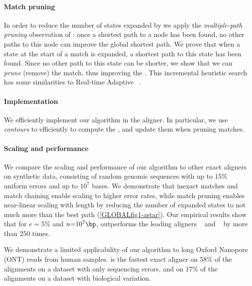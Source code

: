 \paragraph{Match pruning}
In order to reduce the number of states expanded by \A we apply the
\emph{multiple-path pruning} observation of \citet{poole2017artificial}: once a
shortest path to a node has been found, no other paths to this node can
improve the global shortest path. We prove that when a state at the start of a
match is expanded, a shortest path to this state has been found. Since no other
path to this state can be shorter, we show that we can \emph{prune} (remove) the
match, thus improving the \sh. This incremental heuristic search has some
similarities to Real-time Adaptive \A~\citep{koenig2006real}.

\paragraph{Implementation}
We efficiently implement our algorithm in the \astarpa aligner. In particular,
we use \emph{contours}
\citep{hirschberg1977algorithms,hunt1977fast,pavetic2017fast} to efficiently to
compute the \csh, and update them when pruning matches.

\paragraph{Scaling and performance}
We compare the scaling and performance of our algorithm to other exact aligners
on synthetic data, consisting of random genomic sequences with up to $15\%$
uniform errors and up to $10^7$ bases. We demonstrate that inexact matches and
match chaining enable scaling to higher error rates, while match pruning enables
near-linear scaling with length by reducing the number of expanded states to not
much more than the best path (\cref{GLOBALfig1-astar}). Our empirical results
show that for $e{=}5\%$ and $n{=}10^7\bp$, \astarpa outperforms the leading
aligners \edlib~\citep{vsovsic2017edlib} and \wfa~\citep{marco2022optimal} by
more than $250$ times.

We demonstrate a limited applicability of our algorithm to long Oxford
Nanopore (ONT) reads from human samples. \astarpa is the fastest exact aligner
on $58\%$ of the alignments on a dataset with only sequencing
errors, and on $17\%$ of the alignments on a dataset with biological
variation.


